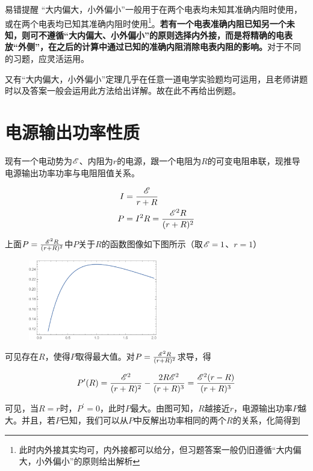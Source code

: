\begin{mk}{易错提醒}{}
“大内偏大，小外偏小”一般用于在两个电表均未知其准确内阻时使用，或在两个电表均已知其准确内阻时使用\footnote{此时内外接其实均可，内外接都可以给分，但习题答案一般仍旧遵循“大内偏大，小外偏小”的原则给出解析}。\textbf{若有一个电表准确内阻已知另一个未知，则可不遵循“大内偏大、小外偏小”的原则选择内外接，而是将精确的电表放“外侧”，在之后的计算中通过已知的准确内阻消除电表内阻的影响。}对于不同的习题，应灵活运用。
\end{mk}

又有“大内偏大，小外偏小”定理几乎在任意一道电学实验题均可运用，且老师讲题时以及答案一般会运用此方法给出详解。故在此不再给出例题。

\section{电源输出功率性质}
\label{s_wdlzdgl}

现有一个电动势为$\mathscr{E}$、内阻为$r$的电源，跟一个电阻为$R$的可变电阻串联，现推导电源输出功率功率与电阻阻值关系。

\begin{subequations}
\begin{align*}
I &= \frac{\mathscr{E}}{r + R} \\
P &= I^2 R = \frac{\mathscr{E}^2 R}{(r + R)^2}
\end{align*}
\end{subequations}

上面$P = \frac{\mathscr{E}^2 R}{(r + R)^2}$中$P$关于$R$的函数图像如下图所示（取$\mathscr{E} = 1$、$r = 1$）

\begin{figure}[htbp]
\centering
\includegraphics[width=0.5\textwidth]{pic_eled/zdgl_p1.pdf}
\end{figure}

可见存在$R$，使得$P$取得最大值。对$P = \frac{\mathscr{E}^2 R}{(r + R)^2}$求导，得

$$P^{\prime}(R) = \frac{\mathscr{E}^2}{(r+R)^2}-\frac{2 R \mathscr{E}^2}{(r+R)^3} = \frac{\mathscr{E}^2 (r-R)}{(r+R)^3}$$

可见，当$R=r$时，$P^{\prime} = 0$，此时$P$最大。由图可知，$R$越接近$r$，电源输出功率$P$越大。并且，若$P$已知，我们可以从$P$中反解出功率相同的两个$R$的关系，化简得到

